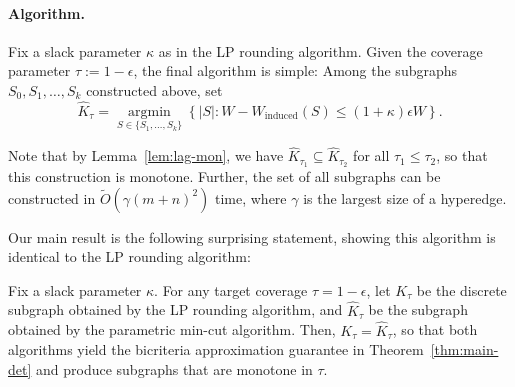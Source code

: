 \paragraph{Algorithm.} Fix a slack parameter $\kappa$ as in the LP rounding algorithm.  Given the coverage parameter $\tau := 1- \epsilon$, the final algorithm is simple: Among the subgraphs $S_0, S_1, \ldots, S_k$ constructed above, set 
\[ \hat{K}_{\tau} = \operatorname*{argmin}_{S \in \{S_1, \dots, S_k\}} \left\{ |S| : W - W_{\text{induced}}(S) \le (1+\kappa)\epsilon W \right\}. \]

Note that by Lemma~\ref{lem:lag-mon}, we have $\hat{K}_{\tau_1} \subseteq \hat{K}_{\tau_2}$ for all $\tau_1 \le \tau_2$, so that this construction is monotone. Further, the set of all subgraphs can be constructed in $\tilde{O}(\gamma (m+n)^2)$ time, where $\gamma$ is the largest size of a hyperedge.

Our main result is the following surprising statement, showing this algorithm is identical to the LP rounding algorithm:

\begin{theorem}
\label{thm:mon}
Fix a slack parameter $\kappa$. For any target coverage $\tau  = 1 -\epsilon$, let $K_\tau$ be the discrete subgraph obtained by the LP rounding algorithm, and $\hat{K}_{\tau}$ be the subgraph obtained by the parametric min-cut algorithm. Then,  $K_{\tau} = \hat{K}_{\tau}$, so that both algorithms yield the bicriteria approximation guarantee in Theorem~\ref{thm:main-det} and produce subgraphs that are monotone in $\tau$.
\end{theorem}





